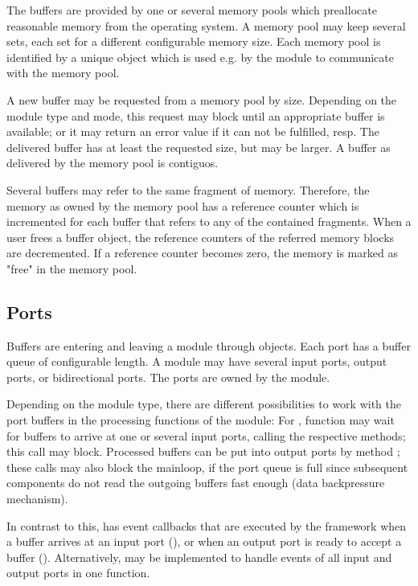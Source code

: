 The buffers are provided by one or several memory pools 
which preallocate reasonable memory from the operating system. 
A memory pool may keep several sets, each set for a different 
configurable memory size. Each memory pool is identified by a 
unique  object which is used e.g. by the module to 
communicate with the memory pool.  

A new buffer may be requested from a memory pool by size. 
Depending on the module type and mode, this request may block until an 
appropriate buffer is available; or it may return an error value 
if it can not be fulfilled, resp. The delivered buffer has at 
least the requested size, but may be larger. A buffer as 
delivered by the memory pool is contiguos. 

Several buffers may refer to the same fragment of memory. 
Therefore, the memory as owned by the memory pool has a 
reference counter which is incremented for each buffer 
that refers to any of the contained fragments. When a user frees 
a buffer object, the reference counters of the referred 
memory blocks are decremented. If a reference counter becomes 
zero, the memory is marked as "free" in the memory pool.

      
\subsection{Ports}
Buffers are entering and leaving a module through  objects. 
Each port has a buffer queue of configurable length.
A module may have several input ports, output ports, 
or bidirectional ports. The ports are owned by the module.

Depending on the module type, there are different possibilities to
work with the port buffers in the processing functions of the module: 
For , function  may wait for buffers 
to arrive at one or several input ports, calling the respective  methods; this call may block. 
Processed buffers can be put into output ports by method ; 
these calls may also block the mainloop, if the port queue is full since
subsequent components do not read the outgoing buffers fast enough (data backpressure mechanism).

In contrast to this,  has event callbacks that are executed 
by the framework when a buffer arrives at an input 
port (), or when an output 
port is ready to accept a buffer (). 
Alternatively,  may be implemented to handle events of all input and output ports
in one function. 




